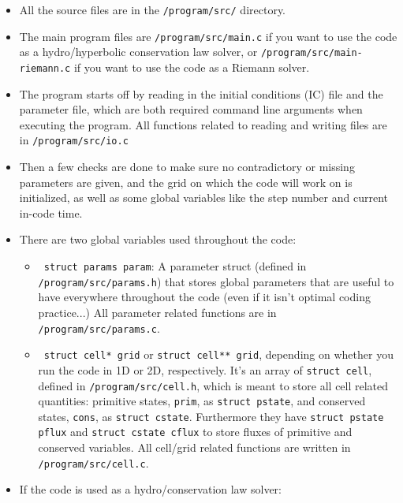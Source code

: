 \begin{itemize}
	\item 	All the source files are in the \texttt{/program/src/} directory.
	
	\item 	The main program files are \texttt{/program/src/main.c} if you want to use the code as a hydro/hyperbolic conservation law solver, or \texttt{/program/src/main-riemann.c} if you want to use the code as a Riemann solver.
	
	\item 	The program starts off by reading in the initial conditions (IC) file and the parameter file, which are both required command line arguments when executing the program.
			All functions related to reading and writing files are in \texttt{/program/src/io.c}
	
	\item 	Then a few checks are done to make sure no contradictory or missing parameters are given, and the grid on which the code will work on is initialized, as well as some global variables like the step number and current in-code time.
	
	\item 	There are two global variables used throughout the code:
	
		\begin{itemize}
			\item 	\texttt{ struct params param}: A parameter struct (defined in \texttt{/program/src/params.h}) that stores global parameters that are useful to have everywhere throughout the code (even if it isn't optimal coding practice...)
					All parameter related functions are in \texttt{/program/src/params.c}.
			
			\item 	\texttt{ struct cell* grid} or \texttt{struct cell** grid}, depending on whether you run the code in 1D or 2D, respectively.
					It's an array of \texttt{struct cell}, defined in \texttt{/program/src/cell.h}, which is meant to store all cell related quantities: primitive states, \texttt{prim}, as  \texttt{struct pstate}, and conserved states, \texttt{cons}, as \texttt{struct cstate}.
					Furthermore they have \texttt{struct pstate pflux} and \texttt{struct cstate cflux} to store fluxes of primitive and conserved variables.
					All cell/grid related functions are written in \texttt{/program/src/cell.c}.	
		\end{itemize}
	
	\item 	If the code is used as a hydro/conservation law solver: 
	

\end{itemize}
